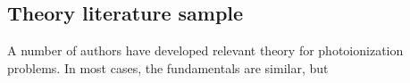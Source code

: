 \subsection{Theory literature sample\label{sec:theory-lit}}

A number of authors have developed relevant theory for photoionization problems. In most cases, the fundamentals are similar, but 